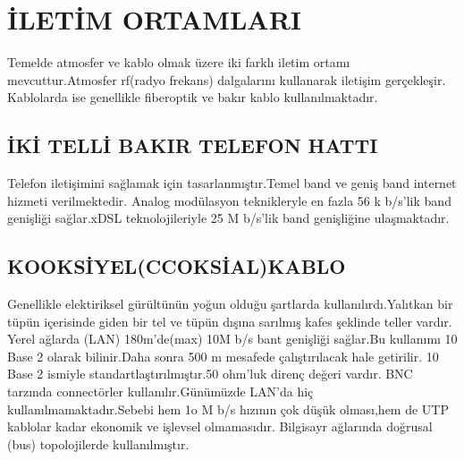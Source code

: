\section{İLETİM ORTAMLARI}
Temelde atmosfer ve kablo olmak üzere iki farklı iletim ortamı mevcuttur.Atmosfer rf(radyo frekans) dalgalarını kullanarak  iletişim gerçekleşir.
Kablolarda ise genellikle fiberoptik ve bakır kablo kullanılmaktadır.

\subsection{İKİ TELLİ BAKIR TELEFON HATTI }
Telefon iletişimini sağlamak için tasarlanmıştır.Temel band ve geniş band internet hizmeti verilmektedir.
Analog modülasyon teknikleryle en fazla 56 k b/s'lik band genişliği sağlar.xDSL teknolojileriyle 25 M b/s'lik band genişliğine ulaşmaktadır.  

 \subsection{KOOKSİYEL(CCOKSİAL)KABLO}
 Genellikle elektiriksel gürültünün yoğun olduğu şartlarda kullanılırdı.Yalıtkan bir tüpün içerisinde  giden bir tel ve tüpün dışına sarılmış kafes şeklinde teller vardır.
 Yerel ağlarda (LAN) 180m'de(max) 10M b/s bant genişliği sağlar.Bu kullanımı 10 Base 2 olarak bilinir.Daha sonra 500 m mesafede çalıştırılacak hale getirilir. 10 Base 2 ismiyle standartlaştırılmıştır.50 ohm'luk direnç değeri vardır.
 BNC tarzında connectörler kullanılır.Günümüzde LAN'da hiç kullanılmamaktadır.Sebebi hem 1o M b/s  hızının çok düşük olması,hem de UTP kablolar kadar ekonomik ve işlevsel olmamasıdır.
 Bilgisayr ağlarında doğrusal (bus) topolojilerde kullanılmıştır. 


